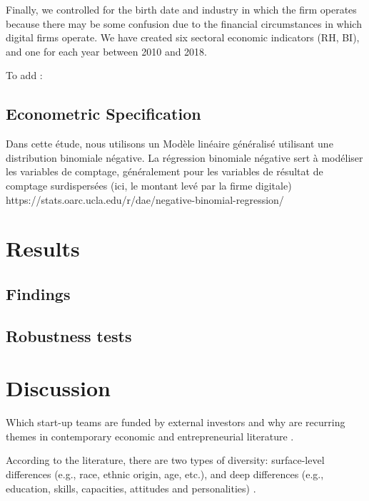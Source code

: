 \documentclass[12pt]{article}
\begin{document}
Finally, we controlled for the birth date and industry in which the firm operates because there may be some confusion due to the financial circumstances in which digital firms operate. We have created six sectoral economic indicators (RH, BI), and one for each year between 2010 and 2018.

To add : \citet{ratzinger2018impact}

\subsection{Econometric Specification}

Dans cette étude, nous utilisons un Modèle linéaire généralisé utilisant une distribution binomiale négative. La régression binomiale négative sert à modéliser les variables de comptage, généralement pour les variables de résultat de comptage surdispersées (ici, le montant levé par la firme digitale) https://stats.oarc.ucla.edu/r/dae/negative-binomial-regression/

\section{Results}

\subsection{Findings}


\subsection{Robustness tests}


\section{Discussion}

Which start-up teams are funded by external investors and why are recurring themes in contemporary economic and entrepreneurial literature \citep{baum2004picking, beckman2007early, bernstein2017attracting, franke2006you, franke2008venture, plummer2016better, kaplan2009should, shane2002network}.

According to the literature, there are two types of diversity: surface-level differences (e.g., race, ethnic origin, age, etc.), and deep differences (e.g., education, skills, capacities, attitudes and personalities) \citep{bell2007deep}.
\end{document}
